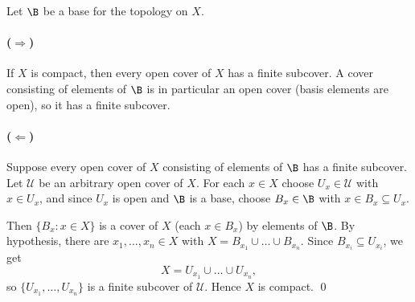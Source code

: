 
Let $\B$ be a base for the topology on $X$.

\paragraph{($\Longrightarrow$)} If $X$ is compact, then every open cover of $X$ has a finite
subcover. A cover consisting of elements of $\B$ is in particular an open cover (basis elements
are open), so it has a finite subcover.

\paragraph{($\Longleftarrow$)} Suppose every open cover of $X$ consisting of elements of $\B$
has a finite subcover. Let $\mathcal{U}$ be an arbitrary open cover of $X$. For each $x\in X$
choose $U_x\in\mathcal{U}$ with $x\in U_x$, and since $U_x$ is open and $\B$ is a base, choose
$B_x\in\B$ with $x\in B_x\subseteq U_x$.

Then $\{B_x : x\in X\}$ is a cover of $X$ (each $x\in B_x$) by elements of $\B$. By hypothesis,
there are $x_1,\dots,x_n\in X$ with $X=B_{x_1}\cup\dots\cup B_{x_n}$. Since
$B_{x_i}\subseteq U_{x_i}$, we get
\[ X=U_{x_1}\cup\dots\cup U_{x_n}, \]
so $\{U_{x_1},\dots,U_{x_n}\}$ is a finite subcover of $\mathcal{U}$. Hence $X$ is compact. \qed
